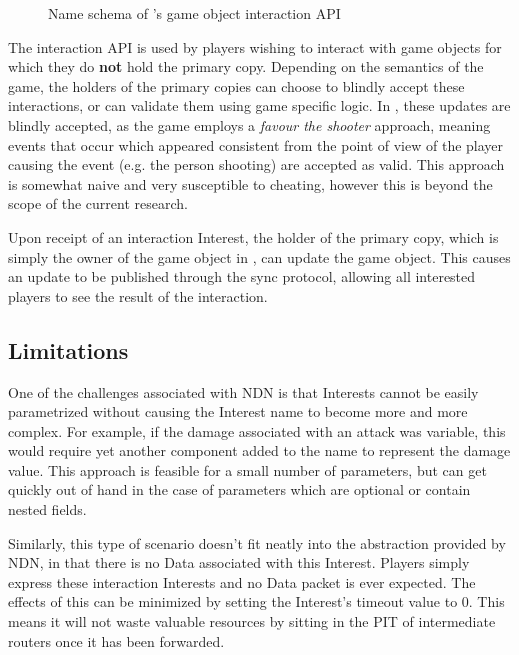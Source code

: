 \begin{figure}[H]
    \centering
    \caption{Name schema of \game{}'s game object interaction API}
    \label{fig:des:interaction-api-name}
\end{figure}

The interaction API is used by players wishing to interact with game objects for which they do \textbf{not} hold the primary copy. Depending on the semantics of the game, the holders of the primary copies can choose to blindly accept these interactions, or can validate them using game specific logic. In \game{}, these updates are blindly accepted, as the game employs a \textit{favour the shooter} approach, meaning events that occur which appeared consistent from the point of view of the player causing the event (e.g. the person shooting) are accepted as valid. This approach is somewhat naive and very susceptible to cheating, however this is beyond the scope of the current research. 

Upon receipt of an interaction Interest, the holder of the primary copy, which is simply the owner of the game object in \game{}, can update the game object. This causes an update to be published through the sync protocol, allowing all interested players to see the result of the interaction.


\subsection{Limitations}\label{sec:des:interaction:limitations}
One of the challenges associated with NDN is that Interests cannot be easily parametrized without causing the Interest name to become more and more complex. For example, if the damage associated with an attack was variable, this would require yet another component added to the name to represent the damage value. This approach is feasible for a small number of parameters, but can get quickly out of hand in the case of parameters which are optional or contain nested fields. 

Similarly, this type of scenario doesn't fit neatly into the abstraction provided by NDN, in that there is no Data associated with this Interest. Players simply express these interaction Interests and no Data packet is ever expected. The effects of this can be minimized by setting the Interest's timeout value to 0. This means it will not waste valuable resources by sitting in the PIT of intermediate routers once it has been forwarded.

